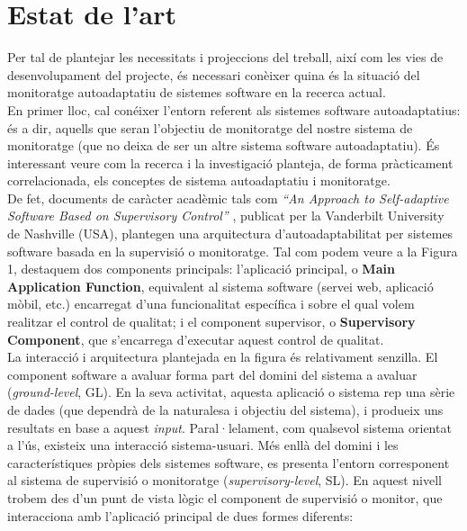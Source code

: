 
\section{Estat de l'art}

Per tal de plantejar les necessitats i projeccions del treball, així com les vies de desenvolupament del projecte, és necessari conèixer quina és la situació del monitoratge autoadaptatiu de sistemes software en la recerca actual.\\

En primer lloc, cal conéixer l’entorn referent als sistemes software autoadaptatius: és a dir, aquells que seran l’objectiu de monitoratge del nostre sistema de monitoratge (que no deixa de ser un altre sistema software autoadaptatiu). És interessant veure com la recerca i la investigació planteja, de forma pràcticament correlacionada, els conceptes de sistema autoadaptatiu i monitoratge.\\

De fet, documents de caràcter acadèmic tals com \textit{“An Approach to Self-adaptive Software Based on Supervisory Control”} , publicat per la Vanderbilt University de Nashville (USA), plantegen una arquitectura d’autoadaptabilitat per sistemes software basada en la supervisió o monitoratge. Tal com podem veure a la Figura 1, destaquem dos components principals: l’aplicació principal, o \textbf{Main Application Function}, equivalent al sistema software (servei web, aplicació mòbil, etc.) encarregat d'una funcionalitat específica i sobre el qual volem realitzar el control de qualitat; i el component supervisor, o \textbf{Supervisory Component}, que s'encarrega d'executar aquest control de qualitat.\\

La interacció i arquitectura plantejada en la figura és relativament senzilla. El component software a avaluar forma part del domini del sistema a avaluar (\textit{ground-level}, GL). En la seva activitat, aquesta aplicació o sistema rep una sèrie de dades (que dependrà de la naturalesa i objectiu del sistema), i produeix uns resultats en base a aquest \textit{input}. Paral·lelament, com qualsevol sistema orientat a l'ús, existeix una interacció sistema-usuari. Més enllà del domini i les característiques pròpies dels sistemes software, es presenta l'entorn corresponent al sistema de supervisió o monitoratge (\textit{supervisory-level}, SL). En aquest nivell trobem des d'un punt de vista lògic el component de supervisió o monitor, que interacciona amb l'aplicació principal de dues formes diferents:

